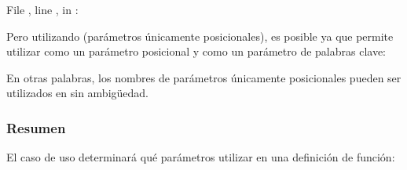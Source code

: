 \documentclass[a4,10pt,spanish]{sphinxmanual}
\begin{document}
\begin{sphinxVerbatim}[commandchars=\\\{\}]
  
  File , line , in 
: 
\end{sphinxVerbatim}

\sphinxAtStartPar
Pero utilizando \sphinxcode{\sphinxupquote{/}} (parámetros únicamente posicionales), es posible ya que permite utilizar  como un parámetro posicional y  como un parámetro de palabras clave:

\begin{sphinxVerbatim}[commandchars=\\\{\}]
   
       
   
\end{sphinxVerbatim}

\sphinxAtStartPar
En otras palabras, los nombres de parámetros únicamente posicionales pueden ser utilizados en  sin ambigüedad.


\subsubsection{Resumen}
\label{\detokenize{tutorial/controlflow:recap}}
\sphinxAtStartPar
El caso de uso determinará qué parámetros utilizar en una definición de función:

\begin{sphinxVerbatim}[commandchars=\\\{\}]
       
\end{sphinxVerbatim}
\end{document}
